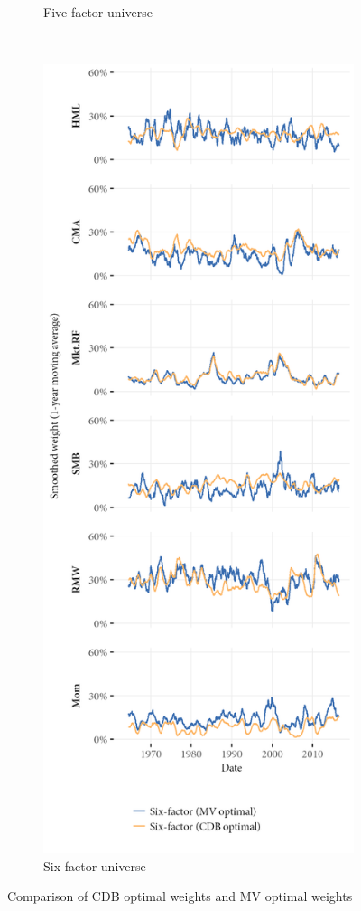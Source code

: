 \begin{figure}[htbp]
\begin{subfigure}{0.45\textwidth}
    \caption{Five-factor universe}
  \end{subfigure}
  ~
  \begin{subfigure}{0.45\textwidth}
    \includegraphics[width=\textwidth]{graphics/weights/compare_Weights_CDB_MV_6F.png}
    \caption{Six-factor universe}
  \end{subfigure}  
  \caption{Comparison of CDB optimal weights and MV optimal weights}
  \label{fig:cdb_mv_compare}


\end{figure}
